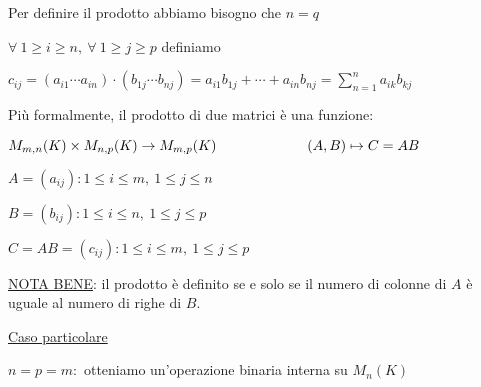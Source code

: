 \documentclass{article}
\begin{document}
{\begin{itemize}
	      Per definire il prodotto abbiamo bisogno che $n=q$

	      $\forall\ 1\ge i\ge n,\ \forall\ 1\ge j\ge p$ definiamo

	      $c_{ij}=(a_{i1}\cdots a_{in})\cdot(b_{1j}\cdots b_{nj})=a_{i1}b_{1j}+\cdots+a_{in}b_{nj}=\sum^n_{n=1}{a_{ik}b_{kj}}$

	      Più formalmente, il prodotto di due matrici è una funzione:

	      $M_{m,n}(K)\times M_{n,p}(K)\rightarrow M_{m,p}(K)\\\hspace*{6.5em}(A,B)\mapsto C=AB$

	      $A=(a_{ij}): 1\le i\le m,\ 1\le j\le n$

	      $B=(b_{ij}): 1\le i\le n,\ 1\le j\le p$

	      $C=AB=(c_{ij}): 1\le i\le m,\ 1\le j\le p$

	      \ul{NOTA BENE}: il prodotto è definito se e solo se il numero di colonne di $A$ è uguale al numero di righe di $B$.

	      \ul{Caso particolare}

	      $n=p=m:$ otteniamo un'operazione binaria interna su $M_n(K)$
\end{itemize}
}
\end{document}
